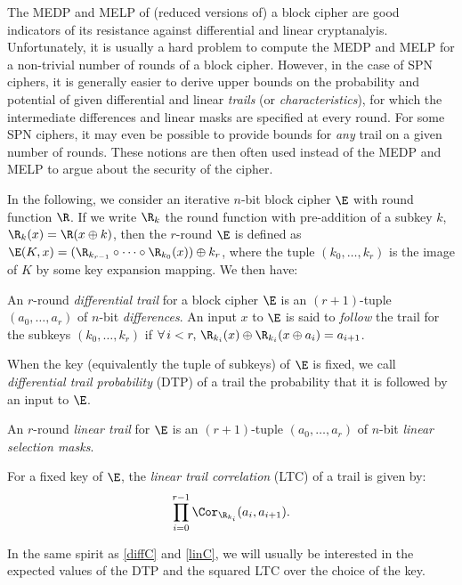 The MEDP and MELP of (reduced versions of) a block cipher are good indicators of its resistance against differential and linear cryptanalyis.
Unfortunately, it is usually a hard problem to compute the MEDP and MELP for a non-trivial number of rounds of a block cipher.
However, in the case of SPN ciphers,
it is generally easier to derive upper bounds on the probability and potential of given differential and linear
\emph{trails} (or \emph{characteristics}), for which the intermediate differences and linear masks are specified at every round. For some
SPN ciphers, it may even be possible to provide bounds for \emph{any} trail on a given number of rounds. These notions are then often
used instead of the MEDP and MELP to argue about the security of the cipher.

\medskip

In the following, we consider an iterative $n$-bit block cipher $\E$ with round function $\R$. If we write $\R_k$ the
round function with pre-addition of a subkey $k$, \ie $\R_k(x) = \R(x \oplus k)$,
then the $r$-round $\E$ is defined as $\E(K,x) = (\R_{k_{r-1}} \circ \cdots \circ \R_{k_0}(x)) \oplus k_r$, where the tuple
$(k_0,\ldots,k_r)$ is the image of $K$ by some key expansion mapping. We then have:

\begin{defi}
An $r$-round \emph{differential trail} for a block cipher $\E$ is an $(r+1)$-tuple $(a_0,\ldots,a_r)$ of $n$-bit \emph{differences}.
An input $x$ to $\E$ is said to \emph{follow} the trail for the subkeys $(k_0,\ldots,k_r)$
if $\forall\, i < r,\,\R_{k_i}(x) \oplus \R_{k_i}(x \oplus a_i) = a_{i+1}$.

\noindent
When the key (equivalently the tuple of subkeys) of $\E$ is fixed, we call \emph{differential trail probability} (DTP) of a trail the probability
that it is followed by an input to $\E$.
\end{defi}

\begin{defi}
\label{linT}
An $r$-round \emph{linear trail} for $\E$ is an $(r+1)$-tuple $(a_0,\ldots,a_r)$ of $n$-bit \emph{linear selection masks}.

\noindent
For a fixed key of $\E$, the \emph{linear trail correlation} (LTC) of a trail is given by:
\[
\prod_{i=0}^{r-1} \Cor_{\R_{k_i}}(a_i, a_{i+1}).
\]
\end{defi}

In the same spirit as \autoref{diffC} and \autoref{linC}, we will usually be interested in the expected values of the DTP
and the squared LTC over the choice of the key.

